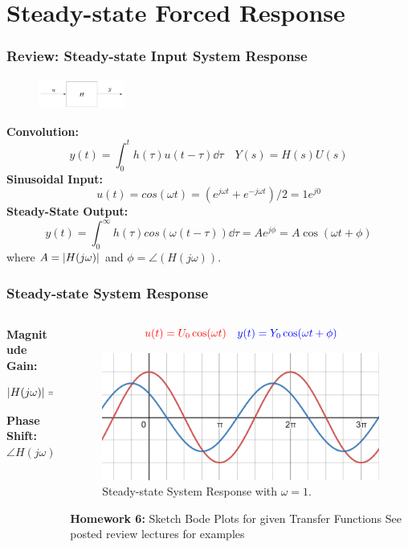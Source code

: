 \documentclass[aspectratio=169]{beamer}
\begin{document}
\section{Steady-state Forced Response}
\begin{frame}
	\frametitle{Review: Steady-state Input System Response}
	\begin{figure}
		\centering
		\includegraphics[width = 0.25\textwidth]{Images/H(s)_BlockDiagram.png}
	\end{figure}
	\textbf{Convolution:} 
	\[
		y(t) = \int_{0}^{t} h(\tau) u(t - \tau) \dd \tau 
		\quad 
		Y(s) = H(s) U(s)
	\]
	\textbf{Sinusoidal Input:} 
	\[
		u(t) = cos(\omega t) = (e^{j\omega t} + e^{-j\omega t})/2 = 1 e^{j 0}
	\]
	\textbf{Steady-State Output:} 
	\[
		y(t) = \int_{0}^{\infty} h(\tau) cos(\omega (t - \tau)) \dd \tau = A e^{j \phi} = A \cos(\omega t + \phi)
	\]
	where $A = \abs{H(j \omega)}$ and $\phi = \angle(H(j \omega))$.
\end{frame}


\begin{frame}
	\frametitle{Steady-state System Response}
	\begin{columns}
		\begin{column}{0.3\textwidth}
			\textbf{Magnitude Gain:} 
			\[\abs{H(j\omega)} = \frac{Y_0}{U_0} = \frac{1.5}{2} = 0.75\]
			\textbf{Phase Shift:}
			\[\angle{H(j\omega)} = \phi = \frac{\pi}{4}\]
		\end{column}
		\begin{column}{0.5\textwidth}
			\[
				\color{red}
				u(t) = U_0 \cos(\omega t)
				\quad
				\color{blue}
				y(t) = Y_0 \cos(\omega t + \phi)
			\]
			\begin{figure}
				\includegraphics[width=\textwidth]{Images/phase_shift.png}
				Steady-state System Response with $\omega = 1$.
			\end{figure}
			\footnotesize{
				\textbf{Homework 6:}
				Sketch Bode Plots for given Transfer Functions
				\tiny{See posted review lectures for examples}
			}
		\end{column}
	\end{columns}
\end{frame}
\end{document}
